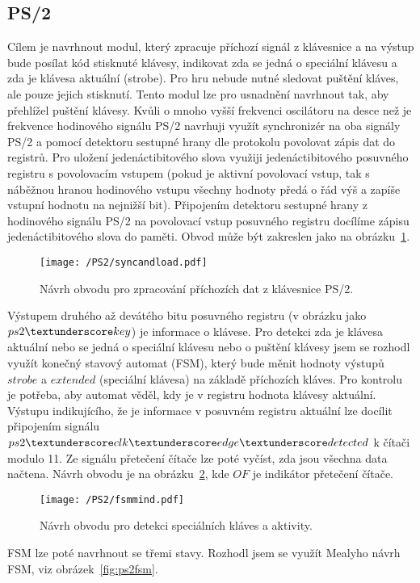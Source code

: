 \documentclass{report}
\begin{document}
\subsection{PS/2}\label{sec:ps2sub}
Cílem je navrhnout modul, který zpracuje příchozí signál z klávesnice a na výstup bude posílat kód stisknuté klávesy, indikovat zda se jedná o speciální klávesu a zda je klávesa aktuální (strobe). Pro hru nebude nutné sledovat puštění kláves, ale pouze jejich stisknutí. Tento modul lze pro usnadnění navrhnout tak, aby přehlížel puštění klávesy. Kvůli o mnoho vyšší frekvenci oscilátoru na desce než je frekvence hodinového signálu PS/2 navrhuji využít synchronizér na oba signály PS/2 a pomocí detektoru sestupné hrany dle protokolu povolovat zápis dat do registrů. Pro uložení jedenáctibitového slova využiji jedenáctibitového posuvného registru s povolovacím vstupem (pokud je aktivní povolovací vstup, tak s náběžnou hranou hodinového vstupu všechny hodnoty předá o řád výš a zapíše vstupní hodnotu na nejnižší bit). Připojením detektoru sestupné hrany z hodinového signálu PS/2 na povolovací vstup posuvného registru docílíme zápisu jedenáctibitového slova do paměti. Obvod může být zakreslen jako na obrázku~\ref{fig:syncandload}.
\begin{figure}
\centering
\texttt{[image: /PS2/syncandload.pdf]}
\caption{Návrh obvodu pro zpracování příchozích dat z klávesnice PS/2.}
\label{fig:syncandload}
\end{figure}
Výstupem druhého až devátého bitu posuvného registru (v obrázku jako $ps2\textunderscore key$) je informace o klávese. Pro detekci zda je klávesa aktuální nebo se jedná o speciální klávesu nebo o puštění klávesy jsem se rozhodl využít konečný stavový automat (FSM), který bude měnit hodnoty výstupů $strobe$ a $extended$ (speciální klávesa) na základě příchozích kláves. Pro kontrolu je potřeba, aby automat věděl, kdy je v registru hodnota klávesy aktuální. Výstupu indikujícího, že je informace v posuvném registru aktuální lze docílit připojením signálu $ps2\textunderscore clk\textunderscore edge\textunderscore detected$ k čítači modulo 11. Ze signálu přetečení čítače lze poté vyčíst, zda jsou všechna data načtena. Návrh obvodu je na obrázku~\ref{fig:fsmmind}, kde $OF$ je indikátor přetečení čítače.
\begin{figure}
\centering
\texttt{[image: /PS2/fsmmind.pdf]}
\caption{Návrh obvodu pro detekci speciálních kláves a aktivity.}
\label{fig:fsmmind}
\end{figure}
FSM lze poté navrhnout se třemi stavy. Rozhodl jsem se využít Mealyho návrh FSM, viz obrázek~\ref{fig:ps2fsm}.
\end{document}
